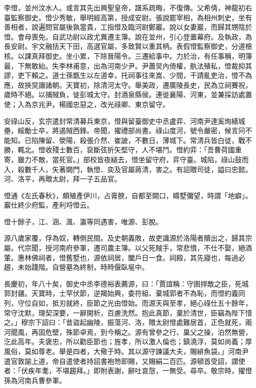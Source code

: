 \begin{pinyinscope}
 李憕，並州汶水人。或言其先出興聖皇帝，譜系疏晦，不復傳。父希倩，神龍初右臺監察御史。憕少秀敏，舉明經高第，授成安尉。張說罷宰相，為相州刺史，坐有善相者，說遍問官屬後孰當貴，工指憕及臨河尉鄭巖。說以女妻巖，而歸其甥陰於憕。會母喪免。自武功尉以政尤異遷主簿。說在並州，引心登置幕府。及執政，為長安尉。宇文融括天下田，高選官屬，多致賢以重其柄。表假憕監察御史，分道檢核。以課真拜御史。坐小累，下除晉陽令。三遷給事中。力於治，有任事稱，明簿最，下無敢紿。失李林甫意，出為河南少尹。尹蕭炅內倚權，骫法殖私，憕裁抑其謬，吏下賴之。道士孫甑生以左道幸，托祠事往來嵩、少間，干請亂吏治，憕不為應，故挾炅譖諸朝。天寶初，除清河太守。舉美政，遷廣陵長史，民為立祠賽祝，歲時不絕。以捕賊負，徙彭城太守。封酒泉縣侯。連徙襄陽、河東，並兼採訪處置使；入為京兆尹。楊國忠惡之，改光祿卿、東京留守。



 安祿山反，玄宗遣封常清募兵東京，憕與留臺御史中丞盧弈、河南尹達奚珣繕城壘，綏勵士卒，將遏賊西鋒。帝聞，擢禮部尚書。祿山度河，號令嚴密，候言冋不能知。已陷陳留、滎陽，殺張介然、崔詖，不數日，薄城下。常清兵皆白徒，戰不勝，輒北。憕收殘士數百，裒斷弦折矢堅守，人不堪鬥。憕約弈：「吾曹荷國重寄，雖力不敵，當死官。」部校皆夜縋去，憕坐留守府，弈守臺。城陷，祿山鼓而入，殺數千人，矢著闕門，執憕、奕及官屬蔣清，害之。有詔贈司徒，謚曰忠懿。河、洛平，再贈太尉，拜一子五品官。



 憕通《左氏春秋》，頗殖產伊川，占膏腴，自都至闕口，疇墅彌望，時謂「地癖」。巖仕終少府監，產利埒憕云。



 憕十餘子，江、涵、渢、瀛等同遇害，唯源、彭脫。



 源八歲家覆，俘為奴，轉側民間。及史朝義敗，故吏識源於洛陽者贖出之，歸其宗屬。代宗聞，授河南府參軍，遷司農主簿。以父死賊手，常悲憤，不仕不娶，絕酒葷。惠林佛祠者，憕舊墅也，源依祠居，闔戶日一食。祠殿，其先寢也，每過必趨，未始踐階。自營墓為終制，時時偃臥埏中。



 長慶初，年八十矣，御史中丞李德裕表薦源，曰：「賈誼稱：守圉捍敵之臣，死城郭封疆。天寶時，士罕伏節，逆羯始興，委符組、棄城郭者不為恥，而憕約義同列，守位自如，抵刃就終，臣節之光由憕始。而源天與至孝，絕心祿仕五十餘年，常守沈默，理契深要，一辭開析，百慮洗然。抱此真節，棄於清世，臣竊為陛下惜之。」穆宗下詔曰：「昔盜起幽陵，振蕩河、洛，贈太尉憕處難居首，正色就死，兩河聞風，再固危壁，殊節卓焉，到今稱之。源有曾參之行、巢父之操，泊然無營，汔此高年。夫褒忠，所以勸臣節也；旌孝，所以激人倫也；鎮澆浮，莫如尚義；厚風俗，莫如尊老。舉是四者，大儆于時。其以源守諫議大夫，賜緋魚袋。」河南尹遣官敦諭上道，帝自遣使者持詔書袍笏即賜，又賜絹二百匹。源頓首受詔，謂使者：「伏疾年耄，不堪趨拜。」即附表謝，辭吐哀愨，一無受。尋卒。敬宗時，擢憕孫為河南兵曹參軍。




\end{pinyinscope}
